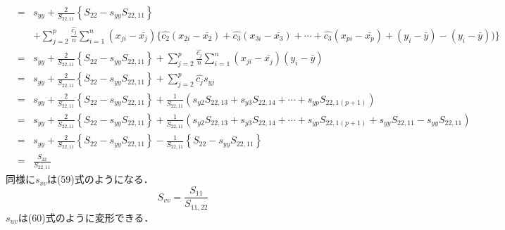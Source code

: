 \documentclass[dvipdfmx]{jsarticle}
\begin{document}
\begin{eqnarray}
  &=& s_{yy}+\frac{2}{S_{22,11}}\left\{S_{22}-s_{yy}S_{22,11}\right\} \nonumber \\
  &&+ \sum_{j=2}^p\frac{\hat{c_j}}{n}\sum_{i=1}^n(x_{ji}-\bar{x_j})\{\hat{c_2}(x_{2i}-\bar{x_2})+\hat{c_3}(x_{3i}-\bar{x_3})+\cdots+\hat{c_3}(x_{pi}-\bar{x_p})+(y_{i}-\bar{y})-(y_{i}-\bar{y}))\} \nonumber \\
  &=& s_{yy}+\frac{2}{S_{22,11}}\left\{S_{22}-s_{yy}S_{22,11}\right\} + \sum_{j=2}^p\frac{\hat{c_j}}{n}\sum_{i=1}^n(x_{ji}-\bar{x_j})(y_i-\bar{y})\nonumber \\
  &=& s_{yy}+\frac{2}{S_{22,11}}\left\{S_{22}-s_{yy}S_{22,11}\right\} + \sum_{j=2}^p\hat{c_j}s_{yj}\nonumber \\
  &=& s_{yy}+\frac{2}{S_{22,11}}\left\{S_{22}-s_{yy}S_{22,11}\right\} + \frac{1}{S_{22,11}}\left(s_{y2}S_{22,13}+s_{y3}S_{22,14}+\cdots+s_{yp}S_{22,1(p+1)}\right)\nonumber \\
  &=& s_{yy}+\frac{2}{S_{22,11}}\left\{S_{22}-s_{yy}S_{22,11}\right\} + \frac{1}{S_{22,11}}\left(s_{y2}S_{22,13}+s_{y3}S_{22,14}+\cdots+s_{yp}S_{22,1(p+1)}+s_{yy}S_{22,11}-s_{yy}S_{22,11}\right)\nonumber \\
  &=& s_{yy}+\frac{2}{S_{22,11}}\left\{S_{22}-s_{yy}S_{22,11}\right\} - \frac{1}{S_{22,11}}\left\{S_{22}-s_{yy}S_{22,11}\right\} \nonumber \\
  &=& \frac{S_{22}}{S_{22,11}}
\end{eqnarray}
同様に$s_{vv}$は(59)式のようになる．
\begin{equation}
  S_{vv}=\frac{S_{11}}{S_{11,22}}
\end{equation}
$s_{uv}$は(60)式のように変形できる．
\end{document}
